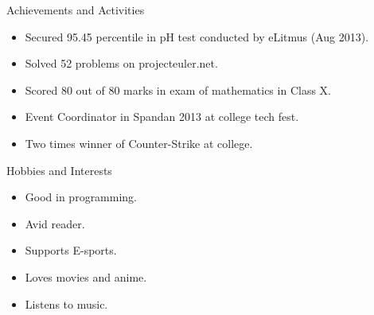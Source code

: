 \documentclass[11pt,oneside]{article}
\newenvironment{ressection}[1]{
  \vspace{4pt}
	     {\fontfamily{phv}\selectfont\Large#1}
	     \begin{itemize}
	       \vspace{3pt}
}{
	     \end{itemize}
}
\newcommand{\resitem}[1]{
  \vspace{-4pt}
\item \begin{flushleft} #1 \end{flushleft}
}
\begin{document}

\begin{ressection}{Achievements and Activities}
  \resitem{Secured 95.45 percentile in pH test conducted by eLitmus (Aug 2013).}
  \resitem{Solved 52 problems on projecteuler.net.}
  \resitem{Scored 80 out of 80 marks in exam of mathematics in Class X.}
  \resitem{Event Coordinator in Spandan 2013 at college tech fest.}
  \resitem{Two times winner of Counter-Strike at college.}
\end{ressection}


\begin{ressection}{Hobbies and Interests}
  \resitem{Good in programming.}
  \resitem{Avid reader.}
  \resitem{Supports E-sports.}
  \resitem{Loves movies and anime.}
  \resitem{Listens to music.}
\end{ressection}
\end{document}
